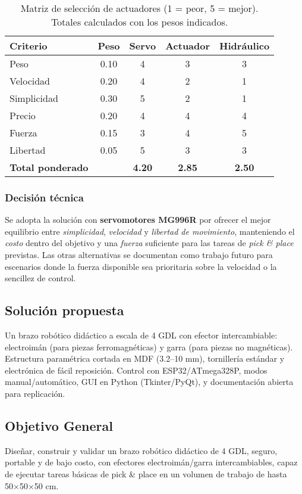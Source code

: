 \begin{table}[h!]
\centering
\begin{tabular}{l c c c c}
\toprule
\textbf{Criterio} & \textbf{Peso} & \textbf{Servo} & \textbf{Actuador} & \textbf{Hidráulico} \\
\midrule
Peso        & 0.10 & 4 & 3 & 3 \\
Velocidad   & 0.20 & 4 & 2 & 1 \\
Simplicidad & 0.30 & 5 & 2 & 1 \\
Precio      & 0.20 & 4 & 4 & 4 \\
Fuerza      & 0.15 & 3 & 4 & 5 \\
Libertad    & 0.05 & 5 & 3 & 3 \\
\midrule
\textbf{Total ponderado} &       & \textbf{4.20} & \textbf{2.85} & \textbf{2.50} \\
\bottomrule
\end{tabular}
\caption{Matriz de selección de actuadores (1 = peor, 5 = mejor). Totales calculados con los pesos indicados.}
\end{table}

\newpage

\subsubsection*{Decisión técnica}
Se adopta la solución con \textbf{servomotores MG996R} por ofrecer el mejor equilibrio entre \emph{simplicidad}, \emph{velocidad} y \emph{libertad de movimiento}, manteniendo el \emph{costo} dentro del objetivo y una \emph{fuerza} suficiente para las tareas de \emph{pick \& place} previstas. Las otras alternativas se documentan como trabajo futuro para escenarios donde la fuerza disponible sea prioritaria sobre la velocidad o la sencillez de control.


\subsection{Solución propuesta}
Un brazo robótico didáctico a escala de 4 GDL con efector intercambiable: electroimán (para piezas ferromagnéticas) y garra (para piezas no magnéticas). Estructura paramétrica cortada en MDF (3.2–10 mm), tornillería estándar y electrónica de fácil reposición. Control con ESP32/ATmega328P, modos manual/automático, GUI en Python (Tkinter/PyQt), y documentación abierta para replicación.

\subsection{Objetivo General}
Diseñar, construir y validar un brazo robótico didáctico de 4 GDL, seguro, portable y de bajo costo, con efectores electroimán/garra intercambiables, capaz de ejecutar tareas básicas de pick \& place en un volumen de trabajo de hasta 50×50×50 cm.


